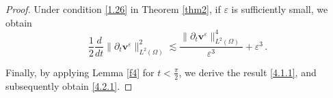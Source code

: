 \documentclass[10pt,a4paper]{amsart}
\begin{document}
\begin{proof}
	
	Under condition  \eqref{1.26} in Theorem \ref{thm2}, if $\varepsilon$ is sufficiently small, we obtain 
	\begin{equation}
		\label{4.20.2}
		\frac{1}{2}\frac{d}{dt}\lVert\partial_t\boldsymbol v^{\varepsilon}\rVert^2_{{L}^2(\Omega)}
		\lesssim
		\frac{
			\lVert
			\partial_t{\boldsymbol v}^{\varepsilon} 	\rVert^{4}_{{L}^2(\Omega)}
		}{
			\varepsilon^3
		}
		+\varepsilon^3\,.
	\end{equation}
	
	Finally, by applying Lemma \ref{f4} for $t< \frac\pi2$, we derive the result \eqref{4.1.1}, and subsequently obtain \eqref{4.2.1}.
\end{proof}
\end{document}
